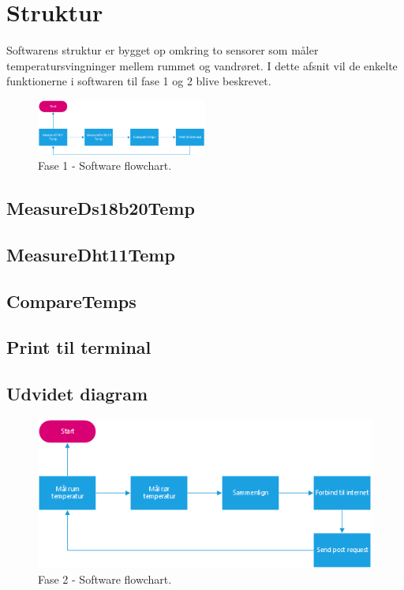 \section{Struktur}
Softwarens struktur er bygget op omkring to sensorer som måler temperatursvingninger mellem rummet og vandrøret. I dette afsnit vil de enkelte funktionerne i softwaren til fase 1 og 2 blive beskrevet. 
\begin{figure}[h!]
  \centering
  \includegraphics[width=0.5\textwidth]{figures/Fase1software2.png}
  \caption{Fase 1 - Software flowchart.}
\end{figure}


\subsection{MeasureDs18b20Temp}

\subsection{MeasureDht11Temp}
\subsection{CompareTemps}
\subsection{Print til terminal}

\subsection{Udvidet diagram}
\begin{figure}[h!]
  \centering
  \includegraphics[width=1\textwidth]{figures/Fase2software.png}
  \caption{Fase 2 - Software flowchart.}
\end{figure}